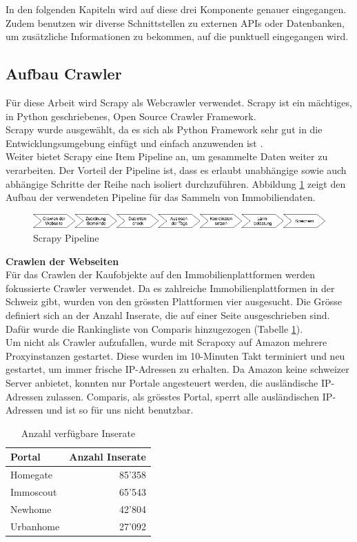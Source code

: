 In den folgenden Kapiteln wird auf diese drei Komponente genauer eingegangen.
Zudem benutzen wir diverse Schnittstellen zu externen APIs oder Datenbanken, um zusätzliche Informationen zu bekommen, auf die punktuell eingegangen wird.

\subsection{Aufbau Crawler}
Für diese Arbeit wird Scrapy als Webcrawler verwendet. Scrapy ist ein mächtiges, in Python geschriebenes, Open Source Crawler Framework.\\
Scrapy wurde ausgewählt, da es sich als Python Framework sehr gut in die Entwicklungsumgebung einfügt und einfach anzuwenden ist \cite{scrapy}.\\
Weiter bietet Scrapy eine Item Pipeline an, um gesammelte Daten weiter zu verarbeiten. Der Vorteil der Pipeline ist, dass es erlaubt unabhängige sowie auch abhängige Schritte der Reihe nach isoliert durchzuführen. Abbildung \ref{fig:scrapy} zeigt den Aufbau der verwendeten Pipeline für das Sammeln von Immobiliendaten.

\begin{figure}[h]
\centering
\includegraphics[width=\textwidth]{images/scrapy.png}
\caption[Scrapy Pipeline]{Scrapy Pipeline}%
\label{fig:scrapy}
\end{figure}

\textbf{Crawlen der Webseiten}\\
Für das Crawlen der Kaufobjekte auf den Immobilienplattformen werden fokussierte Crawler verwendet. Da es zahlreiche Immobilienplattformen in der Schweiz gibt, wurden von den grössten Plattformen vier ausgesucht. Die Grösse definiert sich an der Anzahl Inserate, die auf einer Seite ausgeschrieben sind. Dafür wurde die Rankingliste von Comparis hinzugezogen (Tabelle \ref{tab:portals}).\\
Um nicht als Crawler aufzufallen, wurde mit Scrapoxy auf Amazon mehrere Proxyinstanzen gestartet. Diese wurden im 10-Minuten Takt terminiert und neu gestartet, um immer frische IP-Adressen zu erhalten. Da Amazon keine schweizer Server anbietet, konnten nur Portale angesteuert werden, die ausländische IP-Adressen zulassen. Comparis, als grösstes Portal, sperrt alle ausländischen IP-Adressen und ist so für uns nicht benutzbar.

\begin{table}[ht]
\centering
{}
\begin{tabular}{@{}lr@{}}
\toprule
Portal & Anzahl Inserate \\
\midrule
Homegate & 85'358\\
Immoscout & 65'543\\
Newhome & 42'804\\
Urbanhome & 27'092\\
\bottomrule
\end{tabular}
\caption{Anzahl verfügbare Inserate}
\label{tab:portals}
\end{table}

